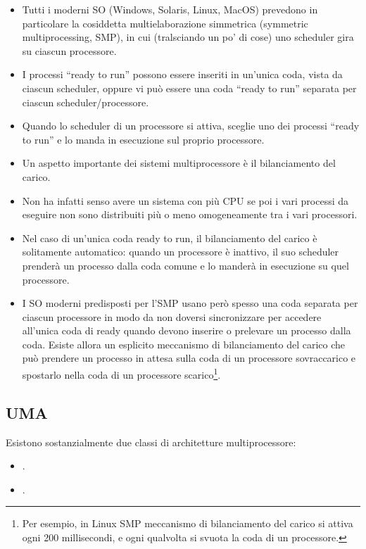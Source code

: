 \begin{itemize}
  \item Tutti i moderni SO (Windows, Solaris, Linux, MacOS) prevedono in
particolare la cosiddetta multielaborazione simmetrica (symmetric
multiprocessing, SMP), in cui (tralsciando un po’ di cose) uno
scheduler gira su ciascun processore. 
\item I processi “ready to run” possono essere inseriti in un’unica coda,
vista da ciascun scheduler, oppure vi può essere una coda “ready to
run” separata per ciascun scheduler/processore. 
\item Quando lo scheduler di un processore si attiva, sceglie uno dei
processi “ready to run” e lo manda in esecuzione sul proprio
processore.
\item Un aspetto importante dei sistemi multiprocessore è il bilanciamento
del carico.
\item Non ha infatti senso avere un sistema con più CPU se poi i vari
processi da eseguire non sono distribuiti più o meno omogeneamente
tra i vari processori. 
\item Nel caso di un’unica coda ready to run, il bilanciamento del carico
è solitamente automatico: quando un processore è inattivo, il suo
scheduler prenderà un processo dalla coda comune e lo manderà in
esecuzione su quel processore.
\item I SO moderni predisposti per l’SMP usano però spesso una coda
separata per ciascun processore in modo da non doversi sincronizzare
per accedere all’unica coda di ready quando devono inserire o
prelevare un processo dalla coda. Esiste allora un esplicito meccanismo di bilanciamento del carico
che può prendere un processo in attesa sulla coda di un processore
sovraccarico e spostarlo nella coda di un processore scarico\footnote{Per esempio, in Linux SMP meccanismo di bilanciamento del carico
si attiva ogni 200 millisecondi, e ogni qualvolta si svuota la coda di
un processore.}.
\end{itemize}

\subsection{UMA}

Esistono sostanzialmente due classi di architetture multiprocessore: 

\begin{itemize}
  \item {}. 
  \item {}.
\end{itemize}

